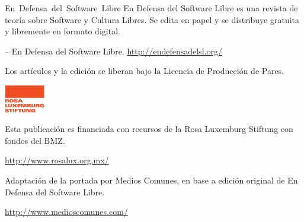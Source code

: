     \newpage
    \thispagestyle{empty}

    \begin{flushleft}\hbox{\Large{En Defensa del Software Libre}}
    En Defensa del Software Libre es una revista de teoría sobre Software y Cultura
    Libres. Se edita en papel y se distribuye gratuita y libremente en formato
    digital.

    \vfill
    \copyleft  \the\year -- En Defensa del Software Libre.
    \url{http://endefensadelsl.org/}

    Los artículos y la edición se liberan bajo la Licencia de Producción
    de Pares.

    \includegraphics[width=50pt]{images/LOGO-RLS-A-CMYK.eps}

    Esta publicación es financiada con recursos de la Rosa Luxemburg
    Stiftung con fondos del BMZ.

    \url{http://www.rosalux.org.mx/}

    Adaptación de la portada por Medios Comunes, en base a edición
    original de En Defensa del Software Libre.

    \url{http://www.medioscomunes.com/}

    \end{flushleft}
   \newpage

